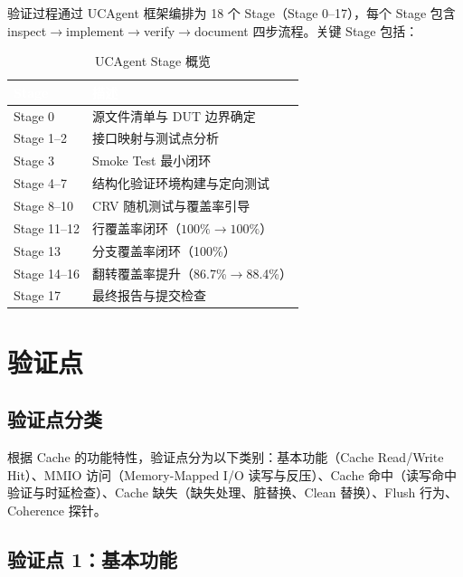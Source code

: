 \documentclass[12pt,a4paper]{ctexart}
\newcommand{\thcell}[1]{\textcolor{white}{\bfseries #1}}
\begin{document}
验证过程通过 UCAgent 框架编排为 18 个 Stage（Stage 0--17），每个 Stage 包含 inspect$\rightarrow$implement$\rightarrow$verify$\rightarrow$document 四步流程。关键 Stage 包括：

\begin{table}[H]
\centering
\caption{UCAgent Stage 概览}
\renewcommand{\arraystretch}{1.3}
\begin{tabular}{@{}p{2.2cm}p{10cm}@{}}
\toprule
\rowcolor{primaryblue}
\thcell{Stage} & \thcell{描述} \\
\midrule
\rowcolor{rowgray} Stage 0 & 源文件清单与 DUT 边界确定 \\
Stage 1--2 & 接口映射与测试点分析 \\
\rowcolor{rowgray} Stage 3 & Smoke Test 最小闭环 \\
Stage 4--7 & 结构化验证环境构建与定向测试 \\
\rowcolor{rowgray} Stage 8--10 & CRV 随机测试与覆盖率引导 \\
Stage 11--12 & 行覆盖率闭环（$100\%\rightarrow100\%$） \\
\rowcolor{rowgray} Stage 13 & 分支覆盖率闭环（100\%） \\
Stage 14--16 & 翻转覆盖率提升（86.7\%$\rightarrow$88.4\%） \\
\rowcolor{rowgray} Stage 17 & 最终报告与提交检查 \\
\bottomrule
\end{tabular}
\end{table}

\newpage

\section{验证点}

\subsection{验证点分类}

根据 Cache 的功能特性，验证点分为以下类别：基本功能（Cache Read/Write Hit）、MMIO 访问（Memory-Mapped I/O 读写与反压）、Cache 命中（读写命中验证与时延检查）、Cache 缺失（缺失处理、脏替换、Clean 替换）、Flush 行为、Coherence 探针。

\subsection{验证点 1：基本功能}
\end{document}
